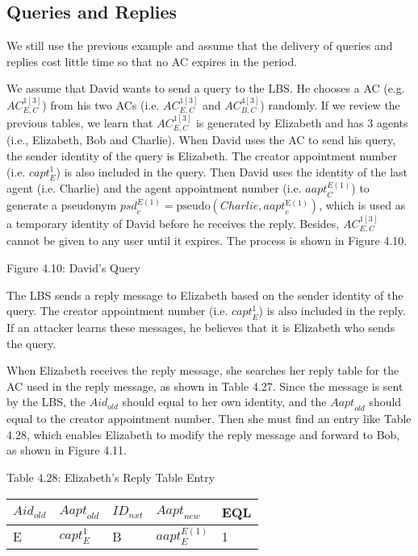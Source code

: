 \subsection{ Queries and Replies}

\noindent We still use the previous example and assume that the delivery of queries and replies cost little time so that no AC expires in the period.

\noindent We assume that David wants to send a query to the LBS. He chooses a AC (e.g. ${AC}^{1\left[3\right]}_{E,C}$) from his two ACs (i.e. ${AC}^{1\left[3\right]}_{E,C}$ and ${AC}^{4\left[3\right]}_{B,C}$) randomly. If we review the previous tables, we learn that ${AC}^{1\left[3\right]}_{E,C}$ is generated by Elizabeth and has 3 agents (i.e., Elizabeth, Bob and Charlie). When David uses the AC to send his query, the sender identity of the query is Elizabeth. The creator appointment number (i.e. ${capt}^1_E$) is also included in the query. Then David uses the identity of the last agent (i.e. Charlie) and the agent appointment number (i.e. ${aapt}^{E\left(1\right)}_C$) to generate a pseudonym ${psd}^{E\left(1\right)}_c=\mathrm{pseudo}\left(Charlie,{aapt}^{\mathrm{E}\left(1\right)}_c\right)$, which is used as a temporary identity of David before he receives the reply. Besides, ${AC}^{1\left[3\right]}_{E,C}$ cannot be given to any user until it expires. The process is shown in Figure 4.10.

Figure 4.10: David's Query

\noindent The LBS sends a reply message to Elizabeth based on the sender identity of the query. The creator appointment number (i.e. ${capt}^1_E$) is also included in the reply. If an attacker learns these messages, he believes that it is Elizabeth who sends the query.

\noindent When Elizabeth receives the reply message, she searches her reply table for the AC used in the reply message, as shown in Table 4.27. Since the message is sent by the LBS, the ${Aid}_{old}$ should equal to her own identity, and the ${Aapt}_{old}$ should equal to the creator appointment number. Then she must find an entry like Table 4.28, which enables Elizabeth to modify the reply message and forward to Bob, as shown in Figure 4.11.

\noindent 

Table 4.28: Elizabeth's Reply Table Entry

\begin{tabular}{|p{0.4in}|p{0.5in}|p{0.3in}|p{0.5in}|p{0.3in}|} \hline 
${Aid}_{old}$ & ${Aapt}_{old}$ & ${ID}_{nxt}$ & ${Aapt}_{new}$ & EQL \\ \hline 
E & ${capt}^1_E$ & B & ${aapt}^{E\left(1\right)}_E$ & 1 \\ \hline 
\end{tabular}


